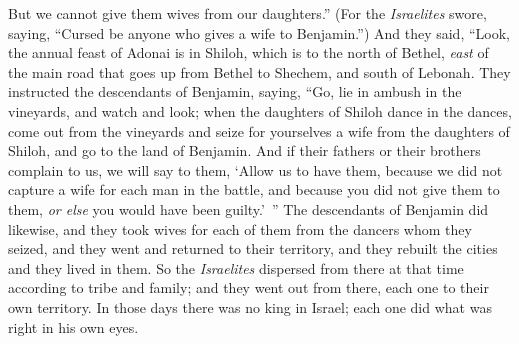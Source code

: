 \begin{biblechapter}
\verse But we cannot give them wives from our daughters.” (For the \textit{Israelites} swore, saying, “Cursed be anyone who gives a wife to Benjamin.”)
\verse And they said, “Look, the annual feast of Adonai is in Shiloh, which is to the north of Bethel, \textit{east} of the main road that goes up from Bethel to Shechem, and south of Lebonah.
\verse They instructed the descendants of Benjamin, saying, “Go, lie in ambush in the vineyards,
\verse and watch and look; when the daughters of Shiloh dance in the dances, come out from the vineyards and seize for yourselves a wife from the daughters of Shiloh, and go to the land of Benjamin.
\verse And if their fathers or their brothers complain to us, we will say to them, ‘Allow us to have them, because we did not capture a wife for each man in the battle, and because you did not give them to them, \textit{or else} you would have been guilty.’ ”
\verse The descendants of Benjamin did likewise, and they took wives for each of them from the dancers whom they seized, and they went and returned to their territory, and they rebuilt the cities and they lived in them.
\verse So the \textit{Israelites} dispersed from there at that time according to tribe and family; and they went out from there, each one to their own territory.
\verse In those days there was no king in Israel; each one did what was right in his own eyes.
\end{biblechapter}

